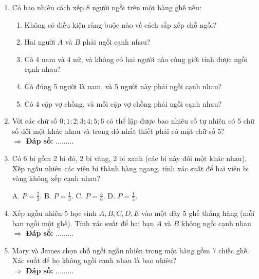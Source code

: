 \documentclass[12pt, a4paper]{article}
\begin{document}
		
		\begin{enumerate}[label=\textbf{\arabic*.}]
			\item Có bao nhiêu cách xếp 8 người ngồi trên một hàng ghế nếu:
			\begin{enumerate}[label=\alph*)]
				\item Không có điều kiện ràng buộc nào về cách sắp xếp chỗ ngồi?
				\item Hai người \(A\) và \(B\) phải ngồi cạnh nhau?
				\item Có 4 nam và 4 nữ, và không có hai người nào cùng giới tính được ngồi cạnh nhau?
				\item Có đúng 5 người là nam, và 5 người này phải ngồi cạnh nhau?
				\item Có 4 cặp vợ chồng, và mỗi cặp vợ chồng phải ngồi cạnh nhau?
			\end{enumerate}
			
			\item Với các chữ số \(0; 1; 2; 3; 4; 5; 6\) có thể lập được bao nhiêu số tự nhiên có 5 chữ số đôi một khác nhau và trong đó nhất thiết phải có mặt chữ số 5? \\
			\(\Rightarrow\) \textbf{Đáp số:} .........
			
			\item Có 6 bi gồm 2 bi đỏ, 2 bi vàng, 2 bi xanh (các bi này đôi một khác nhau). Xếp ngẫu nhiên các viên bi thành hàng ngang, tính xác suất để hai viên bi vàng không xếp cạnh nhau?
			
				A. \(P = \frac{2}{3}\). \hspace{3cm} B. \(P = \frac{1}{3}\). \hspace{3cm} C. \(P = \frac{5}{6}\). \hspace{3cm} D. \(P = \frac{1}{5}\).
		
			
			\item Xếp ngẫu nhiên 5 học sinh \(A, B, C, D, E\) vào một dãy 5 ghế thẳng hàng (mỗi bạn ngồi một ghế). Tính xác suất để hai bạn \(A\) và \(B\) không ngồi cạnh nhau \\
			\(\Rightarrow\) \textbf{Đáp số:} .........
			
			\item Mary và James chọn chỗ ngồi ngẫu nhiên trong một hàng gồm 7 chiếc ghế. Xác suất để họ không ngồi cạnh nhau là bao nhiêu? \\
			\(\Rightarrow\) \textbf{Đáp số:} .........
		\end{enumerate}
\end{document}

